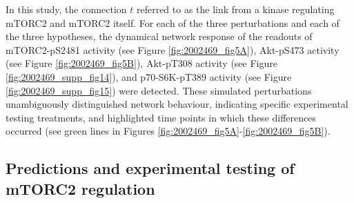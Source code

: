 In this study, the connection $t$ referred to as the link from a kinase regulating mTORC2 and mTORC2 itself. For each of the three perturbations and each of the three hypotheses, the dynamical network response of the readouts of mTORC2-pS2481 activity (see Figure \ref{fig:2002469_fig5A}), Akt-pS473 activity (see Figure \ref{fig:2002469_fig5B}), Akt-pT308 activity (see Figure \ref{fig:2002469_supp_fig14}), and p70-S6K-pT389 activity (see Figure \ref{fig:2002469_supp_fig15}) were detected. These simulated perturbations unambiguously distinguished network behaviour, indicating specific experimental testing treatments, and highlighted time points in which these differences occurred (see green lines in Figures \ref{fig:2002469_fig5A}-\ref{fig:2002469_fig5B}).



\subsection{Predictions and experimental testing of mTORC2 regulation}
\label{paper1-subsec:Predictions and experimental testing of mTORC2 regulation}
